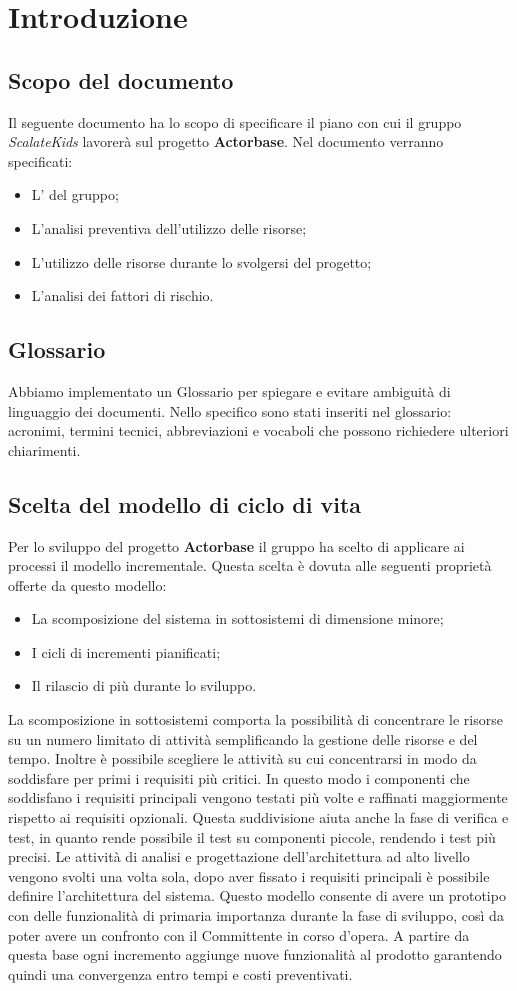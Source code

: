 \documentclass{scalatekids-article}
\begin{document}
\section{Introduzione}
\subsection{Scopo del documento}
Il seguente documento ha lo scopo di specificare il piano con cui il gruppo \textit{ScalateKids} lavorerà sul progetto \textbf{Actorbase}.
Nel documento verranno specificati:
\begin{itemize}
\item {L' del gruppo;}
\item {L'analisi preventiva dell'utilizzo delle risorse;}
\item {L'utilizzo delle risorse durante lo svolgersi del progetto;}
\item {L'analisi dei fattori di rischio.}
\end{itemize}
\subsection{Glossario}
Abbiamo implementato un Glossario per spiegare e evitare ambiguità di linguaggio dei documenti. Nello specifico sono stati inseriti nel glossario: acronimi, termini tecnici, abbreviazioni e vocaboli che possono richiedere ulteriori chiarimenti.
\subsection{Scelta del modello di ciclo di vita}
Per lo sviluppo del progetto \textbf{Actorbase} il gruppo ha scelto di applicare ai processi il modello incrementale. Questa scelta è dovuta alle seguenti proprietà offerte da questo modello:
\begin{itemize}
\item {La scomposizione del sistema in sottosistemi di dimensione minore;}
\item {I cicli di incrementi pianificati;}
\item {Il rilascio di più  durante lo sviluppo.}
\end{itemize}
La scomposizione in sottosistemi comporta la possibilità di concentrare le risorse su un numero limitato di attività semplificando la gestione delle risorse e del tempo. Inoltre è possibile scegliere le attività su cui concentrarsi in modo da soddisfare per primi i requisiti più critici. In questo modo i componenti che soddisfano i requisiti principali vengono testati più volte e raffinati maggiormente rispetto ai requisiti opzionali. Questa suddivisione aiuta anche la fase di verifica e test, in quanto rende possibile il test su componenti piccole, rendendo i test più precisi. Le attività di analisi e progettazione dell'architettura ad alto livello vengono svolti una volta sola, dopo aver fissato i requisiti principali è possibile definire l'architettura del sistema. Questo modello consente di avere un prototipo con delle funzionalità di primaria importanza durante la fase di sviluppo, così da poter avere un confronto con il Committente in corso d'opera. A partire da questa base ogni incremento aggiunge nuove funzionalità al prodotto garantendo quindi una convergenza entro tempi e costi preventivati.
\end{document}
